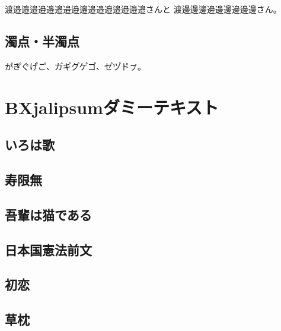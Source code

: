 \documentclass[a4paper,twocolumn,tombow]{xltjarticle}
\begin{document}
渡邉邉󠄀邉󠄁邉󠄂邉󠄃邉󠄄邉󠄅邉󠄆邉󠄇邉󠄈邉󠄉邉󠄊邉󠄋邉󠄌邉󠄍邉󠄎さんと
渡邊邊󠄀邊󠄁邊󠄂邊󠄃邊󠄄邊󠄅邊󠄆邊󠄇さん。

\subsection{濁点・半濁点}

か゚き゚く゚け゚こ゚、カ゚キ゚ク゚ケ゚コ゚、セ゚ツ゚ト゚ㇷ゚。

\newpage
\section{BXjalipsumダミーテキスト}

\subsection{いろは歌}

\subsection{寿限無}

\subsection{吾輩は猫である}

\subsection{日本国憲法前文}

\subsection{初恋}

\subsection{草枕}
\end{document}
